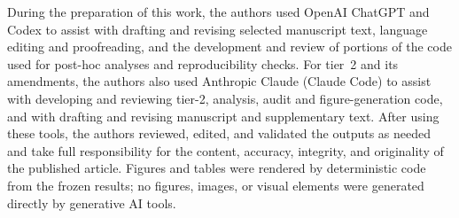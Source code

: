 \documentclass[5p,twocolumn]{elsarticle}
\begin{document}
During the preparation of this work, the authors used OpenAI ChatGPT and Codex
to assist with drafting and revising selected manuscript text, language editing
and proofreading, and the development and review of portions of the code used
for post-hoc analyses and reproducibility checks. For tier~2 and
its amendments, the authors also used Anthropic Claude (Claude Code) to assist
with developing and reviewing tier-2, analysis, audit and
figure-generation code, and with drafting and revising manuscript and
supplementary text. After using these tools, the
authors reviewed, edited, and validated the outputs as needed and take full
responsibility for the content, accuracy, integrity, and originality of the
published article. Figures and tables were rendered by deterministic code
from the frozen results; no figures, images, or visual elements were
generated directly by generative AI tools.




\end{document}
